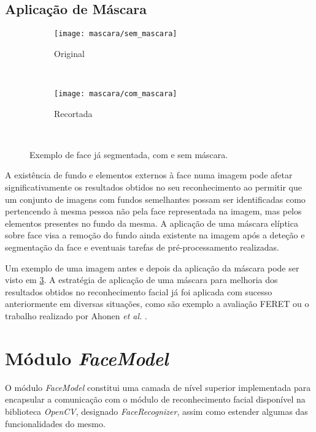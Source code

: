 \subsection{Aplicação de Máscara} \label{sec:mascara}

\begin{figure}[t]
        \centering
        \begin{subfigure}[b]{0.2\textwidth}
                \centering
                \texttt{[image: mascara/sem\_mascara]}
                \caption{Original}
                \label{fig:sem-mascara}
        \end{subfigure}%
        ~ ~ ~
        \begin{subfigure}[b]{0.2\textwidth}
                \centering
                \texttt{[image: mascara/com\_mascara]}
                \caption{Recortada}
                \label{fig:com-mascara}
        \end{subfigure}
        ~ 
        \caption{Exemplo de face já segmentada, com e sem máscara.}\label{fig:mascara}
\end{figure}

A existência de fundo e elementos externos à face numa imagem pode afetar significativamente os resultados obtidos no seu reconhecimento ao permitir que um conjunto de imagens com fundos semelhantes possam ser identificadas como pertencendo à mesma pessoa não pela face representada na imagem, mas pelos elementos presentes no fundo da mesma. A aplicação de uma máscara elíptica sobre face visa a remoção do fundo ainda existente na imagem após a deteção e segmentação da face e eventuais tarefas de pré-processamento realizadas.

Um exemplo de uma imagem antes e depois da aplicação da máscara pode ser visto em \ref{fig:mascara}. A estratégia de aplicação de uma máscara para melhoria dos resultados obtidos no reconhecimento facial já foi aplicada com sucesso anteriormente em diversas situações, como são exemplo a avaliação FERET \cite{Phillips2000} ou o trabalho realizado por Ahonen \textit{et al.} \cite{ahonen2004face}.

\section{Módulo \textit{FaceModel}} \label{sec:facemodel}
O módulo \textit{FaceModel} constitui uma camada de nível superior implementada para encapsular a comunicação com o módulo de reconhecimento facial disponível na biblioteca \textit{OpenCV}, designado \textit{FaceRecognizer}, assim como estender algumas das funcionalidades do mesmo. 

